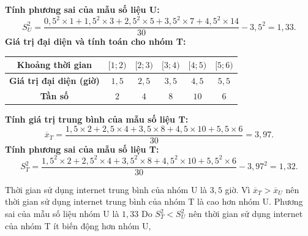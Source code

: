 \begin{ex}
{\textbf{Tính phương sai của mẫu số liệu U:}
$$S^2_U = \frac{0{,}5^2 \times 1 + 1{,}5^2 \times 3 + 2{,}5^2 \times 5 + 3{,}5^2 \times 7 + 4{,}5^2 \times 14}{30} - 3{,}5^2 = 1{,}33.$$
\textbf{Giá trị đại diện và tính toán cho nhóm T:}
\begin{center}
\begin{tabular}{|c|c|c|c|c|c|}
\hline \textbf{Khoảng thời gian} & $[1; 2)$ & $[2; 3)$ & $[3; 4)$ & $[4; 5)$ & $[5; 6)$ \\
\hline \textbf{Giá trị đại diện (giờ)} & $1{,}5$ & $2{,}5$ & $3{,}5$ & $4{,}5$ & $5{,}5$ \\
\hline \textbf{Tần số} & $2$ & $4$ & $8$ & $10$ & $6$ \\
\hline
\end{tabular}
\end{center}
\textbf{Tính giá trị trung bình của mẫu số liệu T:}
$$\overline{x}_T = \frac{1{,}5 \times 2 + 2{,}5 \times 4 + 3{,}5 \times 8 + 4{,}5 \times 10 + 5{,}5 \times 6}{30} = 3{,}97 .$$
\textbf{Tính phương sai của mẫu số liệu T:}
$$S^2_T = \frac{1{,}5^2 \times 2 + 2{,}5^2 \times 4 + 3{,}5^2 \times 8 + 4{,}5^2 \times 10 + 5{,}5^2 \times 6}{30} - 3{,}97^2 = 1{,}32.$$
\begin{itemchoice}
\itemch Thời gian sử dụng internet trung bình của nhóm U là $3{,}5$ giờ.
\itemch Vì $\overline{x}_T>\overline{x}_U$ nên thời gian sử dụng internet trung bình của nhóm T là cao hơn nhóm U.
\itemch Phương sai của mẫu số liệu nhóm U là $1{,}33$
\itemch Do $S_T^2<S_U^2$ nên thời gian sử dụng internet của nhóm T ít biến động hơn nhóm U,
\end{itemchoice}
}
\end{ex}

